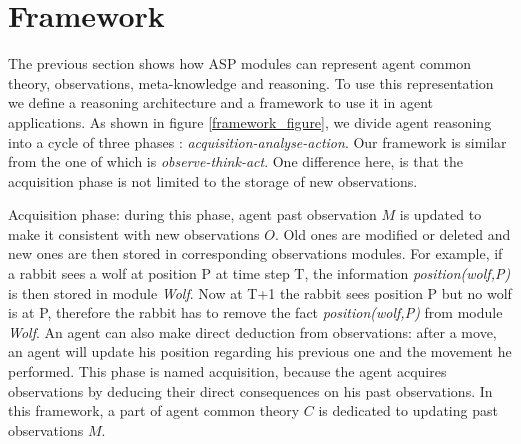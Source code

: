 \documentclass{aamas2012}
\begin{document}
\section{Framework}

	The previous section shows how ASP modules can represent agent common theory, observations, meta-knowledge and reasoning.
	To use this representation we define a reasoning architecture and a framework to use it in agent applications.
	As shown in figure \ref{framework_figure}, we divide agent reasoning into a cycle of three phases : \emph{acquisition-analyse-action}.
	Our framework is similar from the one of \cite{DBLP:journals/amai/KowalskiS99} which is \emph{observe-think-act}.
	One difference here, is that the acquisition phase is not limited to the storage of new observations.
	
	Acquisition phase: during this phase, agent past observation $M$ is updated to make it consistent with new observations $O$.
	Old ones are modified or deleted and new ones are then stored in corresponding observations modules.
	For example, if a rabbit sees a wolf at position P at time step T, the information \emph{position(wolf,P)} is then stored in module \emph{Wolf}.
	Now at T+1 the rabbit sees position P but no wolf is at P, therefore the rabbit has to remove the fact \emph{position(wolf,P)} from module \emph{Wolf}.
	An agent can also make direct deduction from observations: after a move, an agent will update his position regarding his previous one and the movement he performed.
	This phase is named acquisition, because the agent acquires observations by deducing their direct consequences on his past observations.
	In this framework, a part of agent common theory $C$ is dedicated to updating past observations $M$.
	
\end{document}
